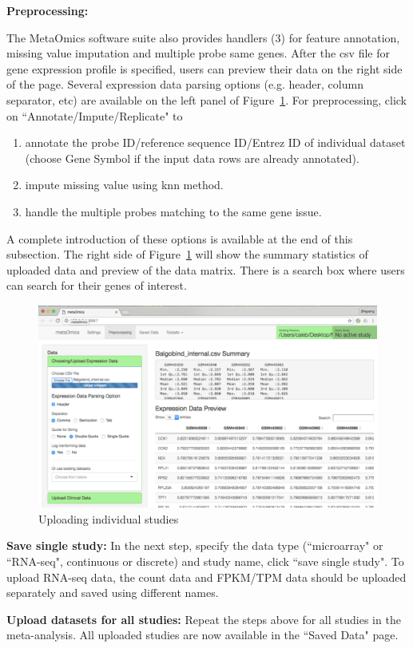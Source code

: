 \begin{steps}
\item \textbf{Preprocessing:}

The MetaOmics software suite also provides handlers {\color{red} (3)} for feature annotation, missing value imputation and multiple probe same genes.
After the csv file for gene expression profile is specified, 
users can preview their data on the right side of the page.
Several expression data parsing options (e.g. header, column separator, etc) are available on the left panel of Figure~\ref{fig:GUIpreview}.
For preprocessing, 
click on ``Annotate/Impute/Replicate" to 
\begin{enumerate}
\item annotate the probe ID/reference sequence ID/Entrez ID of individual dataset (choose Gene Symbol if the input data rows are already annotated).
\item impute missing value using knn method.
\item handle the multiple probes matching to the same gene issue.
\end{enumerate}

A complete introduction of these options is available at the end of this subsection.
The right side of Figure~\ref{fig:GUIpreview} will show the summary statistics of uploaded data and preview of the data matrix.
There is a search box where users can search for their genes of interest.

\begin{figure}[H]
\begin{center}
\includegraphics[scale=0.7]{./figure/preprocessing/GUIpreview}
\caption{Uploading individual studies}
\label{fig:GUIpreview}
\end{center}
\end{figure}

\item \textbf{Save single study:}
In the next step,
specify the data type (``microarray" or ``RNA-seq", continuous or discrete) and study name,
click ``save single study".
To upload RNA-seq data, the count data and FPKM/TPM
 data should be uploaded separately and saved using different names.

\item \textbf{Upload datasets for all studies:}
Repeat the steps above for all studies in the meta-analysis.
All uploaded studies are now available in the ``Saved Data" page. 
 
\end{steps}

